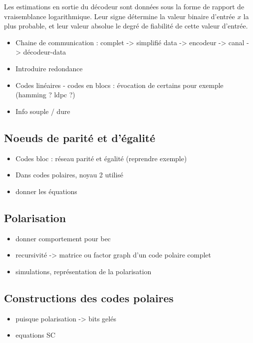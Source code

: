 Les estimations en sortie du décodeur sont données sous la forme de rapport de vraisemblance logarithmique. Leur signe détermine la valeur binaire d'entrée $x$ la plus probable, et leur valeur absolue le degré de fiabilité de cette valeur d'entrée.







\begin{itemize}
\item Chaine de communication : complet -> simplifié data -> encodeur -> canal -> décodeur-data
\item Introduire redondance
\item Codes linéaires - codes en blocs : évocation de certains pour exemple (hamming ? ldpc ?)
\item Info souple / dure

\end{itemize}
\subsection{Noeuds de parité et d'égalité}
\begin{itemize}
\item Codes bloc : réseau parité et égalité (reprendre exemple)
\item Dans codes polaires, noyau 2 utilisé
\item donner les équations
\end{itemize}
\subsection{Polarisation}
\begin{itemize}
\item donner comportement pour bec
\item recursivité -> matrice ou factor graph d'un code polaire complet
\item simulations, représentation de la polarisation
\end{itemize}
\subsection{Constructions des codes polaires}
\begin{itemize}
\item puisque polarisation -> bits gelés
\item equations SC
\end{itemize}

